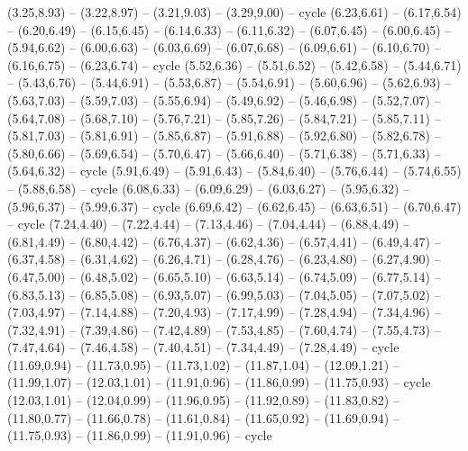 \expandafter\def\csname geo:gebiet:FRO\endcsname{
  (3.25,8.93) -- (3.22,8.97) -- (3.21,9.03) -- (3.29,9.00) -- cycle}
\expandafter\def\csname geo:gebiet:DNK\endcsname{
  (6.23,6.61) -- (6.17,6.54) -- (6.20,6.49) -- (6.15,6.45) -- (6.14,6.33) -- (6.11,6.32) -- (6.07,6.45) -- (6.00,6.45) -- (5.94,6.62) -- (6.00,6.63) -- (6.03,6.69) -- (6.07,6.68) -- (6.09,6.61) -- (6.10,6.70) -- (6.16,6.75) -- (6.23,6.74) -- cycle
  (5.52,6.36) -- (5.51,6.52) -- (5.42,6.58) -- (5.44,6.71) -- (5.43,6.76) -- (5.44,6.91) -- (5.53,6.87) -- (5.54,6.91) -- (5.60,6.96) -- (5.62,6.93) -- (5.63,7.03) -- (5.59,7.03) -- (5.55,6.94) -- (5.49,6.92) -- (5.46,6.98) -- (5.52,7.07) -- (5.64,7.08) -- (5.68,7.10) -- (5.76,7.21) -- (5.85,7.26) -- (5.84,7.21) -- (5.85,7.11) -- (5.81,7.03) -- (5.81,6.91) -- (5.85,6.87) -- (5.91,6.88) -- (5.92,6.80) -- (5.82,6.78) -- (5.80,6.66) -- (5.69,6.54) -- (5.70,6.47) -- (5.66,6.40) -- (5.71,6.38) -- (5.71,6.33) -- (5.64,6.32) -- cycle
  (5.91,6.49) -- (5.91,6.43) -- (5.84,6.40) -- (5.76,6.44) -- (5.74,6.55) -- (5.88,6.58) -- cycle
  (6.08,6.33) -- (6.09,6.29) -- (6.03,6.27) -- (5.95,6.32) -- (5.96,6.37) -- (5.99,6.37) -- cycle
  (6.69,6.42) -- (6.62,6.45) -- (6.63,6.51) -- (6.70,6.47) -- cycle}
\expandafter\def\csname geo:gebiet:CZE\endcsname{
  (7.24,4.40) -- (7.22,4.44) -- (7.13,4.46) -- (7.04,4.44) -- (6.88,4.49) -- (6.81,4.49) -- (6.80,4.42) -- (6.76,4.37) -- (6.62,4.36) -- (6.57,4.41) -- (6.49,4.47) -- (6.37,4.58) -- (6.31,4.62) -- (6.26,4.71) -- (6.28,4.76) -- (6.23,4.80) -- (6.27,4.90) -- (6.47,5.00) -- (6.48,5.02) -- (6.65,5.10) -- (6.63,5.14) -- (6.74,5.09) -- (6.77,5.14) -- (6.83,5.13) -- (6.85,5.08) -- (6.93,5.07) -- (6.99,5.03) -- (7.04,5.05) -- (7.07,5.02) -- (7.03,4.97) -- (7.14,4.88) -- (7.20,4.93) -- (7.17,4.99) -- (7.28,4.94) -- (7.34,4.96) -- (7.32,4.91) -- (7.39,4.86) -- (7.42,4.89) -- (7.53,4.85) -- (7.60,4.74) -- (7.55,4.73) -- (7.47,4.64) -- (7.46,4.58) -- (7.40,4.51) -- (7.34,4.49) -- (7.28,4.49) -- cycle}
\expandafter\def\csname geo:gebiet:CYN\endcsname{
  (11.69,0.94) -- (11.73,0.95) -- (11.73,1.02) -- (11.87,1.04) -- (12.09,1.21) -- (11.99,1.07) -- (12.03,1.01) -- (11.91,0.96) -- (11.86,0.99) -- (11.75,0.93) -- cycle}
\expandafter\def\csname geo:gebiet:CYP\endcsname{
  (12.03,1.01) -- (12.04,0.99) -- (11.96,0.95) -- (11.92,0.89) -- (11.83,0.82) -- (11.80,0.77) -- (11.66,0.78) -- (11.61,0.84) -- (11.65,0.92) -- (11.69,0.94) -- (11.75,0.93) -- (11.86,0.99) -- (11.91,0.96) -- cycle}
